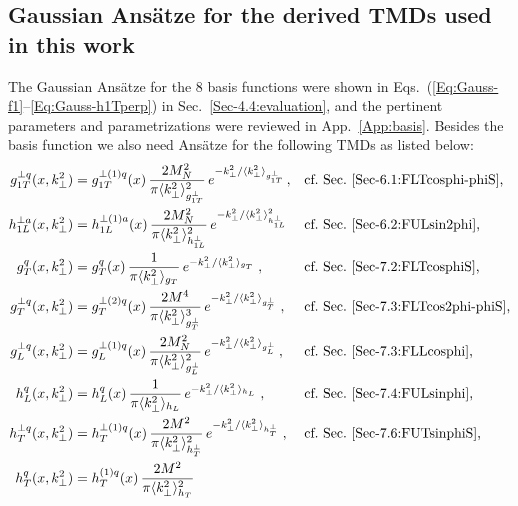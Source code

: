 \documentclass[a4paper,11pt]{article}
\newcommand{\blue}[1]{{\color{blue} #1}}
\newcommand{\la}{\langle}
\newcommand{\ra}{\rangle}
\newcommand{\ps}[1]{\blue{ #1}}
\def\kperp{k_\perp}
\def\avkperp{\la \kperp^2 \ra}
\begin{document}
\ps{
\newpage
\subsection{Gaussian Ans\"atze for the derived TMDs used in this work}
\label{App-B:Gauss-Ansatz-non-basis-TMDs}

The Gaussian Ans\"atze for the 8 basis functions were shown 
in Eqs.~(\ref{Eq:Gauss-f1}--\ref{Eq:Gauss-h1Tperp}) in 
Sec.~\ref{Sec-4.4:evaluation}, and the pertinent parameters
and parametrizations were reviewed in App.~\ref{App:basis}.
Besides the basis function we also need Ans\"atze for the 
following TMDs as listed below:
\begin{subequations}\begin{align}
	g_{1T}^{\perp q}(x,\kperp^2) 
	  &=	g_{1T}^{\perp (1) q}(x)\,
		\frac{2 M_N^2}{\pi \avkperp_{g_{1T}^\perp}^2}\,
		e^{-\kperp^2/{\avkperp_{g_{1T}^\perp}}}  \,, 
	  && 	\mbox{cf.\ Sec.~\ref{Sec-6.1:FLTcosphi-phiS},}
		\label{eq:g1t}\\
	h_{1L}^{\perp a}(x,\kperp^2) 
	  &= 	h_{1L}^{\perp (1) a}(x)\,
		\frac{2 M_N^2}{\pi{\avkperp_{h_{1L}^\perp}^2}}\,
		e^{-\kperp^2/{\avkperp_{h_{1L}^\perp}^2}}
	  && 	\mbox{cf.\ Sec.~\ref{Sec-6.2:FULsin2phi},}	
		\label{eq:h1l_final}\\
	g^{q}_{T}(x,\kperp^2) 
	  &=	g^{q}_{T}(x)\,\frac{1}{\pi \avkperp_{g_{T}}}\,
		e^{-\kperp^2/{\avkperp_{g_{T}}}}\;,
	  && 	\mbox{cf.\ Sec.~\ref{Sec-7.2:FLTcosphiS},}	
		\label{eq:gtnew} \\
	g^{\perp q}_{T}(x,\kperp^2) 
	  &= 	g^{\perp (2) q}_{T}(x)\,\frac{2 M^4}{\pi \avkperp^3_{g_{T}^{\perp} }}\,
		e^{-\kperp^2/{\avkperp_{g_{T}^{\perp} }}}\;,
	  && 	\mbox{cf.\ Sec.~\ref{Sec-7.3:FLTcos2phi-phiS},}	
		\label{eq:gtperpnew} \\
	g_{L}^{\perp q}(x,\kperp^2) 
	  &=	g_{L}^{\perp (1) q}(x)\,
		\frac{2 M_N^2}{\pi \avkperp_{g_{L}^\perp}^2}\,
		e^{-\kperp^2/{\avkperp_{g_{L}^\perp}}}  \,, 
	  && 	\mbox{cf.\ Sec.~\ref{Sec-7.3:FLLcosphi},}
		\label{eq:gLperp} \\
	h_L^q(x,\kperp^2) 
	  &= 	h_L^q(x) \,\frac{1}{\pi \avkperp_{h_{L}}}\,
		e^{-\kperp^2/{\avkperp_{h_{L}}}}\;,
	  && 	\mbox{cf.\ Sec.~\ref{Sec-7.4:FULsinphi},}
		\label{eq:hLnew}\\
	h_T^{\perp q}(x,\kperp^2) 
	  &=	h_T^{\perp (1) q}(x)\,\frac{2 M^2}{\pi \avkperp_{h_{T}^\perp}^2}\,
	  	e^{-\kperp^2/{\avkperp_{h_{T}^\perp}}}\;,
	  && 	\mbox{cf.\ Sec.~\ref{Sec-7.6:FUTsinphiS},}
		\label{eq:hTperpnew}\\
	h_T^{q}(x,\kperp^2) 
	  &=	h_T^{(1) q}(x) \,\frac{2 M^2}{\pi \avkperp_{h_{T}}^2}\,

\end{align}
\end{subequations}}
\end{document}

